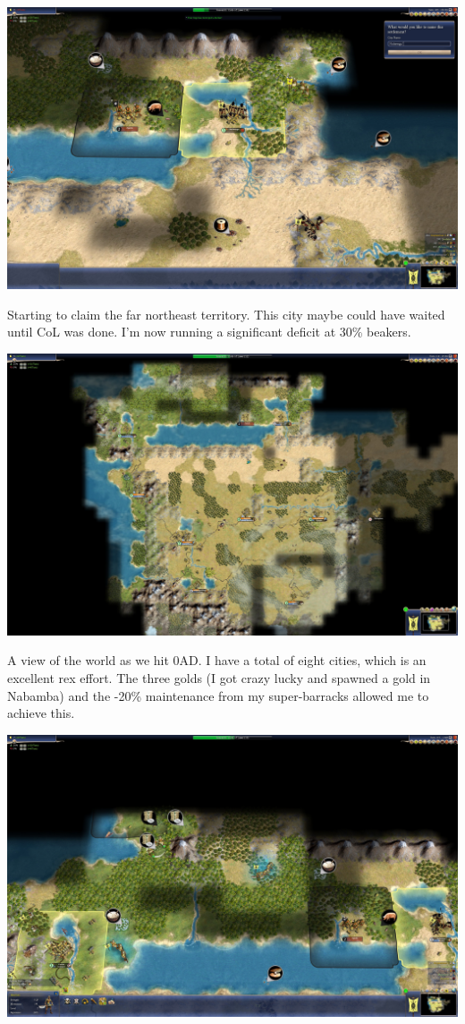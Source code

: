 \documentclass[10pt]{article}
\begin{document}
\includegraphics[width=1.0\textwidth]{85}

Starting to claim the far northeast territory. This city maybe could have waited until CoL was done. I'm now running
a significant deficit at 30\% beakers.

\includegraphics[width=1.0\textwidth]{86}

A view of the world as we hit 0AD. I have a total of eight cities, which is an excellent rex effort. The three golds
(I got crazy lucky and spawned a gold in Nabamba) and the -20\% maintenance from my super-barracks allowed me to
achieve this.

\includegraphics[width=1.0\textwidth]{87}
\end{document}
